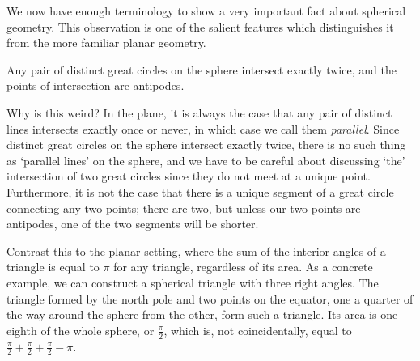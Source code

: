 We now have enough terminology to show a very important fact about spherical geometry.  This  observation is one of the salient features which distinguishes it from the more familiar planar geometry.


\begin{claim}
	Any pair of distinct great circles on the sphere intersect exactly twice, and the points of intersection are antipodes.
\end{claim}



Why is this weird? In the plane, it is always the case that any pair of distinct lines intersects exactly once or never, in which case we call them \textit{parallel}. Since distinct great circles on the sphere intersect exactly twice, there is no such thing as \enquote*{parallel lines} on the sphere, and we have to be careful about discussing `the' intersection of two great circles since they do not meet at a unique point.  Furthermore, it is not the case that there is a unique segment of a great circle connecting any two points; there are two, but unless our two points are antipodes, one of the two segments will be shorter. 




Contrast this to the planar setting, where the sum of the interior angles of a triangle is equal to $\pi$ for any triangle, regardless of its area.  As a concrete example, we can construct a spherical triangle with three right angles.  The triangle formed by the north pole and two points on the equator, one a quarter of the way around the sphere from the other, form such a triangle.  Its area is one eighth of the whole sphere, or $\tfrac{\pi}{2}$, which is, not coincidentally, equal to $\tfrac{\pi}{2}+\tfrac{\pi}{2}+\tfrac{\pi}{2} - \pi$.


